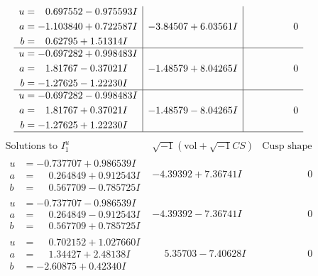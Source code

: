 \documentclass[1p]{elsarticle_modified}
\theoremstyle{definition}
\newcommand{\I}{\sqrt{-1}}
\begin{document}
$$\begin{array}{c|c|c}
\begin{aligned}
u &= \phantom{-}0.697552 - 0.975593 I \\
a &= -1.103840 + 0.722587 I \\
b &= \phantom{-}0.62795 + 1.51314 I\end{aligned}
 & -3.84507 + 6.03561 I & \phantom{-0.000000 } 0 \\ \hline\begin{aligned}
u &= -0.697282 + 0.998483 I \\
a &= \phantom{-}1.81767 - 0.37021 I \\
b &= -1.27625 - 1.22230 I\end{aligned}
 & -1.48579 + 8.04265 I & \phantom{-0.000000 } 0 \\ \hline\begin{aligned}
u &= -0.697282 - 0.998483 I \\
a &= \phantom{-}1.81767 + 0.37021 I \\
b &= -1.27625 + 1.22230 I\end{aligned}
 & -1.48579 - 8.04265 I & \phantom{-0.000000 } 0\\
 \hline 
 \end{array}$$\newpage$$\begin{array}{c|c|c}  
\text{Solutions to }I^u_{1}& \I (\text{vol} + \sqrt{-1}CS) & \text{Cusp shape}\\
 \hline 
\begin{aligned}
u &= -0.737707 + 0.986539 I \\
a &= \phantom{-}0.264849 + 0.912543 I \\
b &= \phantom{-}0.567709 - 0.785725 I\end{aligned}
 & -4.39392 + 7.36741 I & \phantom{-0.000000 } 0 \\ \hline\begin{aligned}
u &= -0.737707 - 0.986539 I \\
a &= \phantom{-}0.264849 - 0.912543 I \\
b &= \phantom{-}0.567709 + 0.785725 I\end{aligned}
 & -4.39392 - 7.36741 I & \phantom{-0.000000 } 0 \\ \hline\begin{aligned}
u &= \phantom{-}0.702152 + 1.027660 I \\
a &= \phantom{-}1.34427 + 2.48138 I \\
b &= -2.60875 + 0.42340 I\end{aligned}
 & \phantom{-}5.35703 - 7.40628 I & \phantom{-0.000000 } 0 \\ \hline\begin{aligned}

\end{aligned}
\end{array}$$
\end{document}
